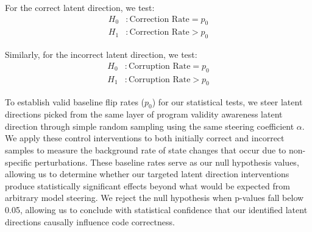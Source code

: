 For the correct latent direction, we test:
\begin{align}
H_0&: \text{Correction Rate} = p_0 \\
H_1&: \text{Correction Rate} > p_0
\end{align}

Similarly, for the incorrect latent direction, we test:
\begin{align}
H_0&: \text{Corruption Rate} = p_0 \\
H_1&: \text{Corruption Rate} > p_0
\end{align}

To establish valid baseline flip rates ($p_0$) for our statistical tests, we steer latent directions picked from the same layer of program validity awareness latent direction through simple random sampling using the same steering coefficient $\alpha$. We apply these control interventions to both initially correct and incorrect samples to measure the background rate of state changes that occur due to non-specific perturbations. These baseline rates serve as our null hypothesis values, allowing us to determine whether our targeted latent direction interventions produce statistically significant effects beyond what would be expected from arbitrary model steering.  We reject the null hypothesis when p-values fall below 0.05, allowing us to conclude with statistical confidence that our identified latent directions causally influence code correctness.
